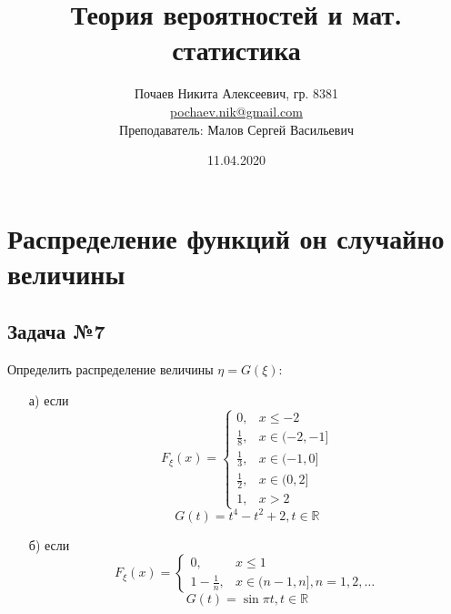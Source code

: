 

\DeclareMathOperator{\eq}{\Leftrightarrow}
\DeclareMathOperator\supp{supp}

\title{Теория вероятностей и мат. статистика}
\date{11.04.2020}
\author{Почаев Никита Алексеевич, гр. 8381 \\ \href{mailto:pochaev.nik@gmail.com}{pochaev.nik@gmail.com} \\ Преподаватель: Малов Сергей Васильевич}


	
\renewcommand{\figurename}{Рисунок}

\maketitle

\section*{Распределение функций он случайно величины}

\subsection*{Задача №7}

\begin{center}
	\qquad
\end{center}

Определить распределение величины $\eta = G(\xi)$:
\begin{enumerate}
	\item[а)] если
	\[
	F_{\xi}(x) =
	\begin{cases}
		0, &x \le -2 \\
		\frac{1}{8}, &x \in (-2, -1] \\
		\frac{1}{3}, &x \in (-1, 0] \\
		\frac{1}{2}, &x \in (0, 2] \\
		1, &x > 2
	\end{cases}
	\]
	\[ G(t) = t^4 - t^2 + 2, t \in \mathbb{R} \]
	\item[б)] если
	\[
	F_{\xi}(x) =
	\begin{cases}
		0, &x \le 1 \\
		1 - \frac{1}{n}, &x \in (n-1, n], n = 1,2,\dots
	\end{cases}
	\]
	\[ G(t) = \sin \pi t, t \in \mathbb{R} \]
\end{enumerate}

